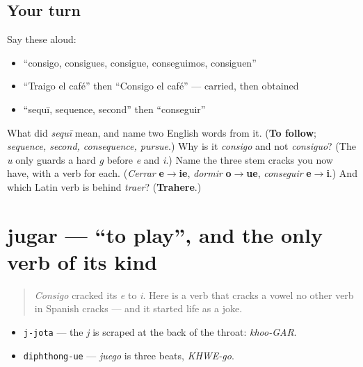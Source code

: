 \subsection*{Your turn}
Say these aloud:

\begin{itemize}
\raggedright
  \item \textquotedblleft{}consigo, consigues, consigue, conseguimos, consiguen\textquotedblright{}
  \item \textquotedblleft{}Traigo el café\textquotedblright{} then \textquotedblleft{}Consigo el café\textquotedblright{} — carried, then obtained
  \item \textquotedblleft{}sequī, sequence, second\textquotedblright{} then \textquotedblleft{}conseguir\textquotedblright{}
\end{itemize}

\begin{tcolorbox}[breakable,colback=teal!4,colframe=teal!35!black,title={Before you move on}]
What did \emph{sequī} mean, and name two English words from it. (\textbf{To follow}; \emph{sequence, second, consequence, pursue}.) Why is it \emph{consigo} and not \emph{consiguo}? (The \emph{u} only guards a hard \emph{g} before \emph{e} and \emph{i}.) Name the three stem cracks you now have, with a verb for each. (\emph{Cerrar} \textbf{e$\to$ie}, \emph{dormir} \textbf{o$\to$ue}, \emph{conseguir} \textbf{e$\to$i}.) And which Latin verb is behind \emph{traer}? (\textbf{Trahere}.)
\end{tcolorbox}
\section[jugar]{jugar — \textquotedblleft{}to play\textquotedblright{}, and the only verb of its kind}

\label{lesson:ES-C39-jugar}



\begin{quote}
\emph{Consigo} cracked its \emph{e} to \emph{i}. Here is a verb that cracks a vowel no other verb in Spanish cracks — and it started life as a joke.
\end{quote}

\begin{sounds}
\begin{itemize}
\raggedright
  \item \texttt{j-jota} — the \emph{j} is scraped at the back of the throat: \emph{khoo-GAR}.
  \item \texttt{diphthong-ue} — \emph{juego} is three beats, \emph{KHWE-go}.
\end{itemize}
\end{sounds}

